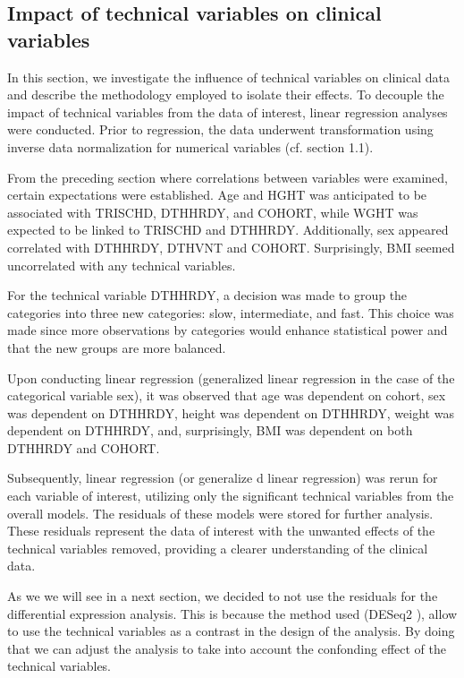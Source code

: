 \documentclass[a4paper, 11pt]{article}
\begin{document}
\begin{multicols}{2}
\subsection{Impact of technical variables on clinical variables}

In this section, we investigate the influence of technical variables on clinical data and describe the methodology employed to isolate their effects.
To decouple the impact of technical variables from the data of interest, linear regression analyses were conducted.
Prior to regression, the data underwent transformation using inverse data normalization for numerical variables (cf. section 1.1).

From the preceding section where correlations between variables were examined, certain expectations were established.
Age and HGHT was anticipated to be associated with TRISCHD, DTHHRDY, and COHORT, while WGHT was expected to be linked to TRISCHD and DTHHRDY.
Additionally, sex appeared correlated with DTHHRDY, DTHVNT and COHORT. Surprisingly, BMI seemed uncorrelated with any technical variables.

For the technical variable DTHHRDY, a decision was made to group the categories into three new categories: slow, intermediate, and fast.
This choice was made since more observations by categories would enhance statistical power and that the new groups are more balanced.

Upon conducting linear regression (generalized linear regression in the case of the categorical variable sex), it was observed that age was dependent on cohort, sex was dependent on DTHHRDY, height was dependent on DTHHRDY, weight was dependent on DTHHRDY, and, surprisingly, BMI was dependent on both DTHHRDY and COHORT.

Subsequently, linear regression (or generalize d linear regression) was rerun for each variable of interest, utilizing only the significant technical variables from the overall models.
The residuals of these models were stored for further analysis.
These residuals represent the data of interest with the unwanted effects of the technical variables removed, providing a clearer understanding of the clinical data.

As we we will see in a next section, we decided to not use the residuals for the differential expression analysis. This is because the method used (DESeq2 \citep{DESeq2:2014}), allow to use the technical variables as a contrast in the design of the analysis. By doing that we can adjust the analysis to take into account the confonding effect of the technical variables.


\end{multicols}
\end{document}
